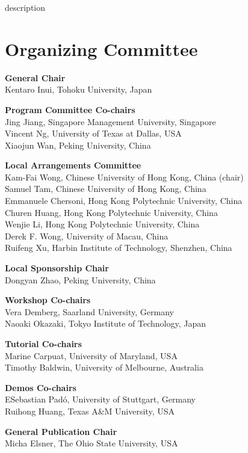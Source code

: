 description\markboth{}{} %
\markright{}{} %

\section{Organizing Committee}

\setlength{\parindent}{0pt}

{\bf General Chair} \\
Kentaro Inui, Tohoku University, Japan       


{\bf Program Committee Co-chairs} \\
Jing Jiang, Singapore Management University, Singapore \\
Vincent Ng, University of Texas at Dallas, USA \\
Xiaojun Wan, Peking University, China

{\bf Local Arrangements Committee} \\
Kam-Fai Wong, Chinese University of Hong Kong, China (chair) \\
Samuel Tam, Chinese University of Hong Kong, China \\
Emmanuele Chersoni, Hong Kong Polytechnic University, China \\
Churen Huang, Hong Kong Polytechnic University, China \\
Wenjie Li, Hong Kong Polytechnic University, China \\
Derek F. Wong, University of Macau, China \\
Ruifeng Xu, Harbin Institute of Technology, Shenzhen, China

{\bf Local Sponsorship Chair} \\
Dongyan Zhao, Peking University, China
        

{\bf Workshop Co-chairs} \\
Vera Demberg, Saarland University, Germany \\
Naoaki Okazaki, Tokyo Institute of Technology, Japan


{\bf Tutorial Co-chairs} \\
Marine Carpuat, University of Maryland, USA \\
Timothy Baldwin, University of Melbourne, Australia

{\bf Demos Co-chairs} \\
ESebastian Pad\'o, University of Stuttgart, Germany \\
Ruihong Huang, Texas A&M University, USA
 

{\bf General Publication Chair} \\
Micha Elsner, The Ohio State University, USA


